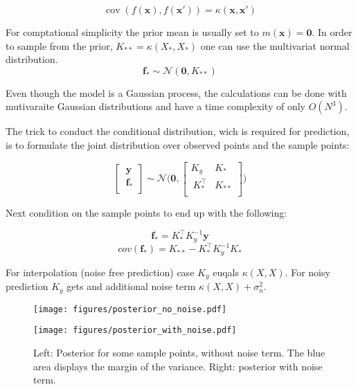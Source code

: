 \documentclass[english]{article}
\begin{document}
$$\operatorname{cov}(f(\mathbf{x}),f(\mathbf{x}')) = \kappa(\mathbf{x},\mathbf{x}')$$

For comptational simplicity the prior mean is usually set to $m(\mathbf{x}) = \mathbf{0}$. In order to sample from the prior, $K_{**} = \kappa(X_*,X_*)$ one can use the multivariat normal distribution.
$$\mathbf{f_*} \sim \mathcal{N}(\mathbf{0}, K_{**})$$

Even though the model is a Gaussian process, the calculations can be done with mutivaraite Gaussian distributions and have a time complexity of only $O(N^3)$.

The trick to conduct the conditional distribution, wich is required for prediction, is to formulate the joint distribution over observed points and the sample points:

$$
\begin{bmatrix}
\ \mathbf{y}\ \\
\ \mathbf{f_*} \\
\end{bmatrix}
\sim \mathcal{N} \Bigg(\mathbf{0},
\begin{bmatrix}
K_y & K_* \\
\ K^{\top}_{*} & K_{**}  \\
\end{bmatrix}
\Bigg)
$$

Next condition on the sample points to end up with the following:

$$\overline{\mathbf{f_*}} = K_*^\top K_y^{-1}\mathbf{y}$$
$$cov(\mathbf{f_*}) = K_{**} - K_*^\top K_y^{-1} K_*$$

For interpolation (noise free prediction) case $K_y$ euqals $\kappa(X,X)$. For noisy prediction $K_y$ gets and additional noise term $\kappa(X,X) + \sigma_n^2$.

\begin{figure}

  \begin{minipage}{0.5\textwidth}
  \texttt{[image: figures/posterior\_no\_noise.pdf]}
  \end{minipage}%
  \begin{minipage}{0.5\textwidth}
  \texttt{[image: figures/posterior\_with\_noise.pdf]}
  \end{minipage}%

  \caption{Left: Posterior for some sample points, without noise term. The blue area displays the margin of the variance. Right: posterior with noise term.}

\end{figure}
\end{document}
